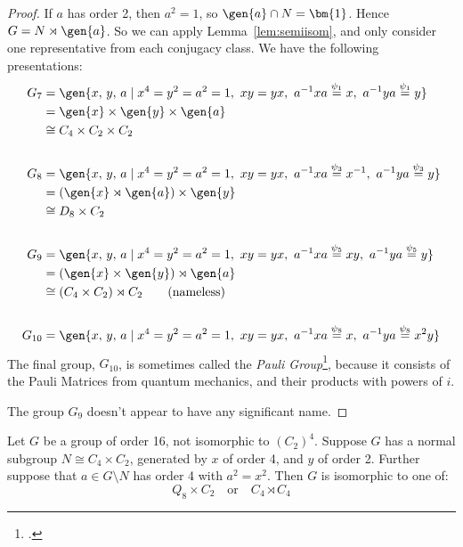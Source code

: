 \begin{proof}
    If \(a\) has order 2, then \(a^2 = 1\), so \(\gen{a} \cap N = \bm{1}\).
    Hence \(G = N \rtimes \gen{a}\).
    So we can apply Lemma~\ref{lem:semiisom}, and only consider one representative from each conjugacy class.
    We have the following presentations:
    \begin{align*}
        G_7 &= \gen{x,\,y,\,a \mid x^4 = y^2 = a^2 = 1,\ xy = yx,\ a^{-1}xa \overset{\psi_1}{=} x,\ a^{-1}ya \overset{\psi_1}{=} y} \\
            &= \gen{x} \times \gen{y} \times \gen{a} \\
            &\cong C_4 \times C_2 \times C_2 \\
            & \\
        G_8 &= \gen{x,\,y,\,a \mid x^4 = y^2 = a^2 = 1,\ xy = yx,\ a^{-1}xa \overset{\psi_3}{=} x^{-1},\ a^{-1}ya \overset{\psi_3}{=} y} \\
            &= (\gen{x} \rtimes \gen{a}) \times \gen{y} \\
            &\cong D_8 \times C_2 \\
            & \\
        G_9 &= \gen{x,\,y,\,a \mid x^4 = y^2 = a^2 = 1,\ xy = yx,\ a^{-1}xa \overset{\psi_5}{=} xy,\ a^{-1}ya \overset{\psi_5}{=} y} \\
            &= (\gen{x} \times \gen{y}) \rtimes \gen{a} \\
            &\cong (C_4 \times C_2) \rtimes C_2 \tag{nameless} \\
            & \\
        G_{10} &= \gen{x,\,y,\,a \mid x^4 = y^2 = a^2 = 1,\ xy = yx,\ a^{-1}xa \overset{\psi_8}{=} x,\ a^{-1}ya \overset{\psi_8}{=} x^2 y}\\
    \end{align*}
    The final group, \(G_{10}\), is sometimes called the \emph{Pauli Group}\footcite{order16names}, because it
    consists of the Pauli Matrices from quantum mechanics, and their products with powers of \(i\).

    The group \(G_9\) doesn't appear to have any significant name.
\end{proof}

\begin{lemma}
    Let \(G\) be a group of order 16, not isomorphic to \({(C_{2})}^4\).
    Suppose \(G\) has a normal subgroup \(N \cong C_4 \times C_2\), generated by \(x\) of order 4, and \(y\) of order 2.
    Further suppose that \(a \in G\setminus N\) has order 4 with \(a^2 = x^2\).
    Then \(G\) is isomorphic to one of:
    \[
        Q_8 \times C_2 \quad \text{or} \quad%
        C_4 \rtimes C_{4}
    \]
\end{lemma}

